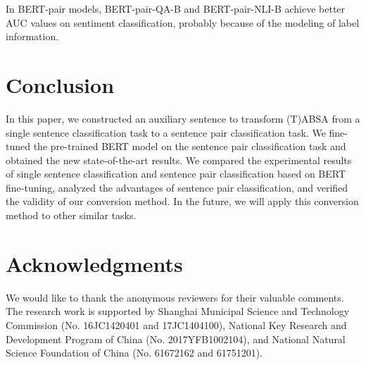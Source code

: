 \documentclass[11pt,a4paper]{article}
\theoremstyle{definition}
\begin{document}
	In BERT-pair models, BERT-pair-QA-B and BERT-pair-NLI-B achieve better AUC values on sentiment classification, probably because of the modeling of label information.
	
	\section{Conclusion}
	In this paper, we constructed an auxiliary sentence to transform (T)ABSA from a single sentence classification task to a sentence pair classification task. We fine-tuned the pre-trained BERT model on the sentence pair classification task and obtained the new state-of-the-art results. We compared the experimental results of single sentence classification and sentence pair classification based on BERT fine-tuning, analyzed the advantages of sentence pair classification, and verified the validity of our conversion method. In the future, we will apply this conversion method to other similar tasks.
	
	\section*{Acknowledgments}
	We would like to thank the anonymous reviewers for their valuable comments. The research work is supported by Shanghai Municipal Science and Technology Commission (No. 16JC1420401 and 17JC1404100),
	National Key Research and Development Program of China (No. 2017YFB1002104),
	and National Natural Science Foundation of China (No. 61672162 and 61751201).
	

	
\end{document}
